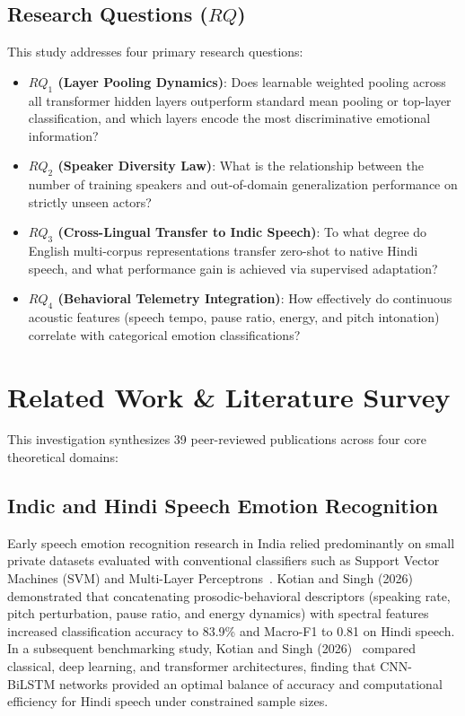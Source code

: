 \documentclass[10pt,journal,compsoc]{IEEEtran}
\begin{document}
\subsection{Research Questions ($RQ$)}
This study addresses four primary research questions:
\begin{itemize}
    \item \textbf{$RQ_1$ (Layer Pooling Dynamics)}: Does learnable weighted pooling across all transformer hidden layers outperform standard mean pooling or top-layer classification, and which layers encode the most discriminative emotional information?
    \item \textbf{$RQ_2$ (Speaker Diversity Law)}: What is the relationship between the number of training speakers and out-of-domain generalization performance on strictly unseen actors?
    \item \textbf{$RQ_3$ (Cross-Lingual Transfer to Indic Speech)}: To what degree do English multi-corpus representations transfer zero-shot to native Hindi speech, and what performance gain is achieved via supervised adaptation?
    \item \textbf{$RQ_4$ (Behavioral Telemetry Integration)}: How effectively do continuous acoustic features (speech tempo, pause ratio, energy, and pitch intonation) correlate with categorical emotion classifications?
\end{itemize}

\section{Related Work \& Literature Survey}
\label{sec:related}

This investigation synthesizes 39 peer-reviewed publications across four core theoretical domains:

\subsection{Indic and Hindi Speech Emotion Recognition}
Early speech emotion recognition research in India relied predominantly on small private datasets evaluated with conventional classifiers such as Support Vector Machines (SVM) and Multi-Layer Perceptrons~\cite{mehra2022beris, livingstone2018ravdess}. Kotian and Singh (2026)~\cite{kotian2026evaluating} demonstrated that concatenating prosodic-behavioral descriptors (speaking rate, pitch perturbation, pause ratio, and energy dynamics) with spectral features increased classification accuracy to 83.9\% and Macro-F1 to 0.81 on Hindi speech. In a subsequent benchmarking study, Kotian and Singh (2026)~\cite{kotian2026benchmarking} compared classical, deep learning, and transformer architectures, finding that CNN-BiLSTM networks provided an optimal balance of accuracy and computational efficiency for Hindi speech under constrained sample sizes.
\end{document}
